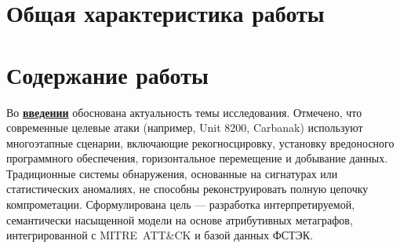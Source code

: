 
\section*{Общая характеристика работы}

\newcommand{\actuality}{\pdfbookmark[1]{Актуальность}{actuality}\underline{\textbf{\actualityTXT}}}
\newcommand{\progress}{\pdfbookmark[1]{Степень разработанности темы исследования}{progress}\underline{\textbf{\progressTXT}}}
\newcommand{\aim}{\pdfbookmark[1]{Цели}{aim}\underline{{\textbf\aimTXT}}}
\newcommand{\tasks}{\pdfbookmark[1]{Задачи}{tasks}\underline{\textbf{\tasksTXT}}}
\newcommand{\novelty}{\pdfbookmark[1]{Научная новизна}{novelty}\underline{\textbf{\noveltyTXT}}}
\newcommand{\influence}{\pdfbookmark[1]{Практическая значимость}{influence}\underline{\textbf{\influenceTXT}}}
\newcommand{\methods}{\pdfbookmark[1]{Методология и методы исследования}{methods}\underline{\textbf{\methodsTXT}}}
\newcommand{\defpositions}{\pdfbookmark[1]{Положения, выносимые на защиту}{defpositions}\underline{\textbf{\defpositionsTXT}}}
\newcommand{\reliability}{\pdfbookmark[1]{Достоверность}{reliability}\underline{\textbf{\reliabilityTXT}}}
\newcommand{\probation}{\pdfbookmark[1]{Апробация}{probation}\underline{\textbf{\probationTXT}}}
\newcommand{\contribution}{\pdfbookmark[1]{Личный вклад}{contribution}\underline{\textbf{\contributionTXT}}}
\newcommand{\structure}{\pdfbookmark[1]{Структура и объём работы}{structure}\underline{\textbf{\structureTXT}}}
\newcommand{\publications}{\pdfbookmark[1]{Публикации}{publications}\underline{\textbf{\publicationsTXT}}}




\bigskip

\section*{Содержание работы}

Во \underline{\textbf{введении}} обоснована актуальность темы исследования. Отмечено, что современные целевые атаки (например, Unit 8200, Carbanak) используют многоэтапные сценарии, включающие рекогносцировку, установку вредоносного программного обеспечения, горизонтальное перемещение и добывание данных. Традиционные системы обнаружения, основанные на сигнатурах или статистических аномалиях, не способны реконструировать полную цепочку компрометации. Сформулирована цель — разработка интерпретируемой, семантически насыщенной модели на основе атрибутивных метаграфов, интегрированной с MITRE~ATT\&CK и базой данных ФСТЭК.

